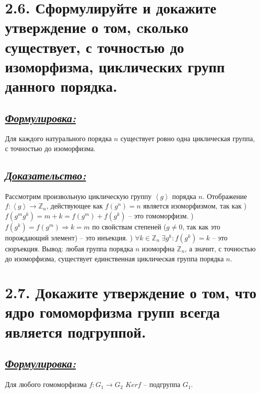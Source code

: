 \documentclass{article}
\begin{document}
\section*{\LARGE 2.6. Сформулируйте и докажите утверждение о том, cколько существует, с точностью до изоморфизма, циклических групп данного порядка. }
\subsection*{\Large \underline{\textit{Формулировка: }}}
Для каждого натурального порядка $n$ существует ровно одна циклическая группа, с точностью до изоморфизма.

\subsection*{\Large \underline{\textit{Доказательство: }}}
Рассмотрим произвольную циклическую группу $\left<g\right>$ порядка $n$. Отображение $f : \left<g\right> \rightarrow \mathbb{Z}_n$, действующее как $f(g^n) = n$ является изоморфизмом, так как
) $f(g^mg^k) = m + k = f(g^m) + f(g^k)$ -- это гомоморфизм.
) $f(g^k) = f(g^m) \Rightarrow k = m$ по свойствам степеней ($g \ne 0$, так как это порождающий элемент) -- это инъекция.
) $\forall k \in \mathbb{Z}_n \; \exists g^k : f(g^k) = k$ -- это сюръекция.
\newline Вывод: любая группа порядка $n$ изоморфна $\mathbb{Z}_n$, а значит, с точностью до изоморфизма, существует единственная циклическая группа порядка $n$.

\section*{\LARGE 2.7. Докажите утверждение о том, что ядро гомоморфизма групп всегда является подгруппой. }
\subsection*{\Large \underline{\textit{Формулировка: }}}
Для любого гомоморфизма $f : G_1 \rightarrow G_2$  $Kerf$ -- подгруппа $G_1$.
\end{document}
